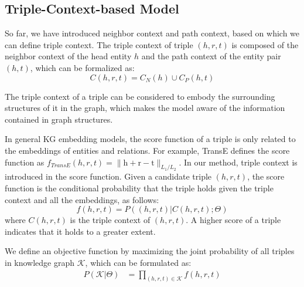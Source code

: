 \subsection{Triple-Context-based Model}
\begin{comment}
In general, a KG embedding model defines a score function for evaluating the confidence of a triple, and optimize an objective function constructed from the score function. For example, TransE wants $\bm{\mathrm{h}} + \bm{\mathrm{r}} \approx \bm{\mathrm{t}}$ when $(h,r,t)$ holds, so it defines the score function as
\begin{equation}\label{TransE_score_function}
  f(h,r,t)=\|\bm{\mathrm{h}} + \bm{\mathrm{r}} -\bm{\mathrm{t}}\|
\end{equation}
which is negative correlation with the confidence of a triple. It could be either the $L_1$ or the $L_2$ norm.\end{comment}
So far, we have introduced neighbor context and path context, based on which we can define triple context. The triple context of triple $(h,r,t)$ is composed of the neighbor context of the head entity $h$ and the path context of the entity pair $(h,t)$, which can be formalized as:
\begin{equation}\label{triple context}
  C(h,r,t) = C_N(h) \cup C_P(h, t)
\end{equation}

The triple context of a triple can be considered to embody the surrounding structures of it in the graph, which makes the model aware of the information contained in graph structures.

In general KG embedding models, the score function of a triple is only related to the embeddings of entities and relations. For example, TransE defines the score function as $f_{TransE}(h,r,t)=\|\bm{\mathrm{h}} + \bm{\mathrm{r}} -\bm{\mathrm{t}}\|_{L_1/L_2}$. In our method, triple context is introduced in the score function. Given a candidate triple $(h,r,t)$, the score function is the conditional probability that the triple holds given the triple context and all the embeddings, as follows:
\begin{equation}\label{score_function}
  f(h,r,t) = P((h,r,t)|C(h,r,t);\Theta)
\end{equation}
where $C(h,r,t)$ is the triple context of $(h,r,t)$. A higher score of a triple indicates that it holds to a greater extent.

We define an objective function by maximizing the joint probability of all triples in knowledge graph $\mathcal{K}$, which can be formulated as:
\begin{align} \label{joint_prob}
  P(\mathcal{K}|\Theta) &= \prod_{(h,r,t)\in \mathcal{K}} f(h,r,t)
\end{align}

